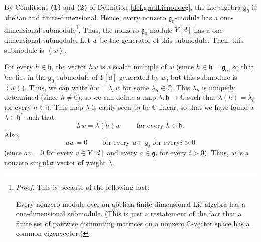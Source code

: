\documentclass
[numbers=enddot,12pt,final,onecolumn,german,notitlepage]{scrartcl}%
\theoremstyle{definition}
\begin{document}
By Conditions \textbf{(1)} and \textbf{(2)} of Definition
\ref{def.gradLienondeg}, the Lie algebra $\mathfrak{g}_{0}$ is abelian and
finite-dimensional. Hence, every nonzero $\mathfrak{g}_{0}$-module has a
one-dimensional submodule\footnote{\textit{Proof.} This is because of the
following fact:
\par
Every nonzero module over an abelian finite-dimensional Lie algebra has a
one-dimensional submodule. (This is just a restatement of the fact that a
finite set of pairwise commuting matrices on a nonzero $\mathbb{C}$-vector
space has a common eigenvector.)}. Thus, the nonzero $\mathfrak{g}_{0}$-module
$Y\left[  d\right]  $ has a one-dimensional submodule. Let $w$ be the
generator of this submodule. Then, this submodule is $\left\langle
w\right\rangle $.

For every $h\in\mathfrak{h}$, the vector $hw$ is a scalar multiple of $w$
(since $h\in\mathfrak{h}=\mathfrak{g}_{0}$, so that $hw$ lies in the
$\mathfrak{g}_{0}$-submodule of $Y\left[  d\right]  $ generated by $w$, but
this submodule is $\left\langle w\right\rangle $). Thus, we can write
$hw=\lambda_{h}w$ for some $\lambda_{h}\in\mathbb{C}$. This $\lambda_{h}$ is
uniquely determined (since $h\neq0$), so we can define a map $\lambda
:\mathfrak{h}\rightarrow\mathbb{C}$ such that $\lambda\left(  h\right)
=\lambda_{h}$ for every $h\in\mathfrak{h}$. This map $\lambda$ is easily seen
to be $\mathbb{C}$-linear, so that we have found a $\lambda\in\mathfrak{h}%
^{\ast}$ such that%
\[
hw=\lambda\left(  h\right)  w\ \ \ \ \ \ \ \ \ \ \text{for every }%
h\in\mathfrak{h}.
\]
Also,%
\[
aw=0\ \ \ \ \ \ \ \ \ \ \text{for every }a\in\mathfrak{g}_{i}\text{ for every
}i>0
\]
(since $av=0$ for every $v\in Y\left[  d\right]  $ and every $a\in
\mathfrak{g}_{i}$ for every $i>0$). Thus, $w$ is a nonzero singular vector of
weight $\lambda$.
\end{document}
